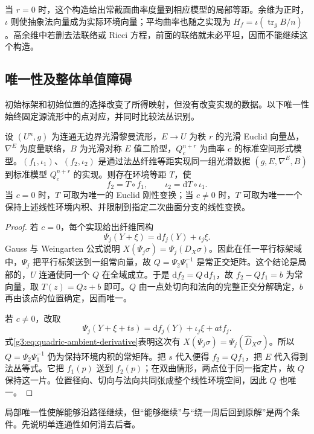 当 \(r=0\) 时，这个构造给出常截面曲率度量到相应模型的局部等距。余维为正时，\(\iota\) 则使抽象法向量成为实际环境向量；平均曲率也随之实现为 \(H_f=\iota(\operatorname{tr}_gB/n)\)。高余维中若删去法联络或 Ricci 方程，前面的联络就未必平坦，因而不能继续这个构造。

\subsection{唯一性及整体单值障碍}
\label{g3:subsec:0403:04}

初始标架和初始位置的选择改变了所得映射，但没有改变实现的数据。以下唯一性始终固定源流形中的点对应，并同时比较法丛识别。

\begin{proposition}\label{g3:prop:submanifold-fundamental-uniqueness}
	设 \((U^n,g)\) 为连通无边界光滑黎曼流形，\(E\to U\) 为秩 \(r\) 的光滑 Euclid 向量丛，\(\nabla^E\) 为度量联络，\(B\) 为光滑对称 \(E\) 值二阶型，\(Q_c^{n+r}\) 为曲率 \(c\) 的标准空间形式模型。\((f_1,\iota_1)\)、\((f_2,\iota_2)\) 是通过法丛纤维等距实现同一组光滑数据 \((g,E,\nabla^E,B)\) 到标准模型 \(Q_c^{n+r}\) 的实现。则存在环境等距 \(T\)，使
	\[
		f_2=T\circ f_1,\qquad
		\iota_2=\mathrm dT\circ\iota_1.
	\]
	当 \(c=0\) 时，\(T\) 可取为唯一的 Euclid 刚性变换；当 \(c\ne0\) 时，\(T\) 可取为唯一一个保持上述线性环境内积、并限制到指定二次曲面分支的线性变换。
\end{proposition}
\begin{proof}
	若 \(c=0\)，每个实现给出纤维同构
	\[
		\Psi_j(Y+\xi)=\mathrm df_j(Y)+\iota_j\xi.
	\]
	Gauss 与 Weingarten 公式说明 \(X(\Psi_j\sigma)=\Psi_j(D_X\sigma)\)。因此在任一平行标架域中，\(\Psi_j\) 把平行标架送到一组常向量，故 \(Q=\Psi_2\Psi_1^{-1}\) 是常正交矩阵。这个结论是局部的，\(U\) 连通使同一个 \(Q\) 在全域成立。于是 \(\mathrm df_2=Q\,\mathrm df_1\)，故 \(f_2-Qf_1=b\) 为常向量，取 \(T(z)=Qz+b\) 即可。\(Q\) 由一点处切向和法向的完整正交分解确定，\(b\) 再由该点的位置确定，因而唯一。

	若 \(c\ne0\)，改取
	\[
		\Psi_j(Y+\xi+t s)
		=\mathrm df_j(Y)+\iota_j\xi+a t f_j.
	\]
	式\eqref{g3:eq:quadric-ambient-derivative}表明这次有 \(X(\Psi_j\sigma)=\Psi_j(\widehat D_X\sigma)\)。所以 \(Q=\Psi_2\Psi_1^{-1}\) 仍为保持环境内积的常矩阵。把 \(s\) 代入便得 \(f_2=Qf_1\)，把 \(E\) 代入得到法丛等式。它把 \(f_1(p)\) 送到 \(f_2(p)\)；在双曲情形，两点位于同一指定片，故 \(Q\) 保持这一片。位置径向、切向与法向共同张成整个线性环境空间，因此 \(Q\) 也唯一。
\end{proof}

局部唯一性使解能够沿路径继续，但“能够继续”与“绕一周后回到原解”是两个条件。先说明单连通性如何消去后者。

